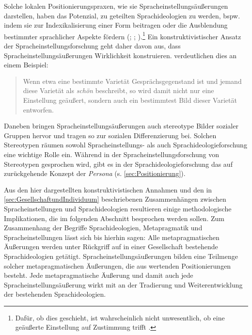 Solche lokalen Positionierungspraxen, wie sie Spracheinstellungsäußerungen darstellen, haben das Potenzial, zu geteilten Sprachideologien zu werden, bspw. indem sie zur Indexikalisierung einer Form beitragen oder die Ausblendung bestimmter sprachlicher Aspekte fördern (\citealp[s.][211]{Tophinke.2006}; \citealp[59]{Cuonz.2014}; \citealp[8]{Spitzmuller.2017b}).\footnote{Dafür, ob dies geschieht, ist wahrscheinlich nicht unwesentlich, ob eine geäußerte Einstellung auf Zustimmung trifft \citep[s.][211]{Tophinke.2006}.}
Ein konstruktivistischer Ansatz der Spracheinstellungsforschung geht daher davon aus, dass Spracheinstellungsäu{\ss}erungen Wirklichkeit konstruieren. 
\citet[]{Tophinke.2006} verdeutlichen dies an einem Beispiel: 
\begin{quote} Wenn etwa eine bestimmte Varietät Gesprächsgegenstand ist und jemand diese Varietät als \textit{schön} beschreibt, so wird damit nicht nur eine Einstellung geäußert, sondern auch ein bestimmtest Bild dieser Varietät entworfen. \citep[209--210]{Tophinke.2006}\end{quote}
Daneben bringen Spracheinstellungsäußerungen auch stereotype Bilder sozialer Gruppen hervor und tragen so zur sozialen Differenzierung bei. 
Solchen Stereotypen räumen sowohl Spracheinstellungs- als auch Sprachideologieforschung eine wichtige Rolle ein. 
Während in der Spracheinstellungsforschung von Stereotypen gesprochen wird, gibt es in der Sprachideologieforschung das auf \citet{Bachtin.1990} zurückgehende Konzept der \textit{Persona} (s. \autoref{sec:Positionierung}).

Aus den hier dargestellten konstruktivistischen Annahmen und den in \autoref{sec:GesellschaftundIndividuum} beschriebenen Zusammenhängen zwischen Spracheinstellungen und Sprachideologien resultieren einige methodologische Implikationen, die im folgenden Abschnitt besprochen werden sollen. 
Zum Zusammenhang der Begriffe Sprachideologien, Metapragmatik und Spracheinstellungen lässt sich bis hierhin sagen: Alle metapragmatischen Äußerungen werden unter Rückgriff auf in einer Gesellschaft bestehende Sprachideologien getätigt. 
Spracheinstellungsäußerungen bilden eine Teilmenge solcher metapragmatischen Äußerungen, die aus wertenden Positionierungen besteht. 
Jede metapragmatische Äußerung und damit auch jede Spracheinstellungsäußerung wirkt mit an der Tradierung und Weiterentwicklung der bestehenden Sprachideologien.
